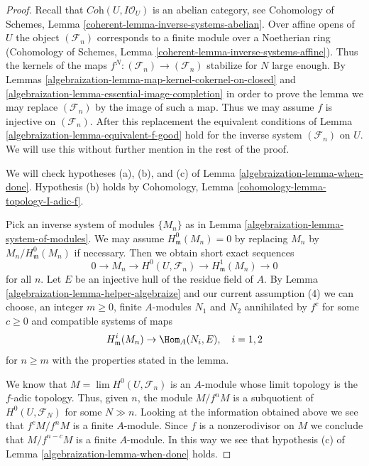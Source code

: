 \begin{proof}

Recall that $\textit{Coh}(U, I\mathcal{O}_U)$ is an abelian category, see
Cohomology of Schemes, Lemma \ref{coherent-lemma-inverse-systems-abelian}.
Over affine opens of $U$ the object $(\mathcal{F}_n)$
corresponds to a finite module over a Noetherian ring
(Cohomology of Schemes, Lemma \ref{coherent-lemma-inverse-systems-affine}).
Thus the kernels of the maps $f^N : (\mathcal{F}_n) \to (\mathcal{F}_n)$
stabilize for $N$ large enough. By
Lemmas \ref{algebraization-lemma-map-kernel-cokernel-on-closed} and
\ref{algebraization-lemma-essential-image-completion}
in order to prove the lemma
we may replace $(\mathcal{F}_n)$ by the image of such a map.
Thus we may assume $f$ is injective on $(\mathcal{F}_n)$.
After this replacement the equivalent conditions of
Lemma \ref{algebraization-lemma-equivalent-f-good} hold for the inverse system
$(\mathcal{F}_n)$ on $U$. We will use this without further mention
in the rest of the proof.

\medskip\noindent
We will check hypotheses (a), (b), and (c) of
Lemma \ref{algebraization-lemma-when-done}. Hypothesis (b) holds by
Cohomology, Lemma \ref{cohomology-lemma-topology-I-adic-f}.

\medskip\noindent
Pick an inverse system of modules $\{M_n\}$ as in
Lemma \ref{algebraization-lemma-system-of-modules}.
We may assume $H^0_\mathfrak m(M_n) = 0$ by replacing $M_n$ by
$M_n/H^0_\mathfrak m(M_n)$ if necessary. Then we obtain short exact
sequences
$$
0 \to M_n \to H^0(U, \mathcal{F}_n) \to H^1_\mathfrak m(M_n) \to 0
$$
for all $n$. Let $E$ be an injective hull of the residue field of $A$.
By Lemma \ref{algebraization-lemma-helper-algebraize} and our current assumption (4)
we can choose, an integer $m \geq 0$, finite $A$-modules
$N_1$ and $N_2$ annihilated by $f^c$ for some $c \geq 0$ and
compatible systems of maps
$$
H^i_\mathfrak m(M_n) \to \Hom_A(N_i, E), \quad i = 1, 2
$$
for $n \geq m$
with the properties stated in the lemma.

\medskip\noindent
We know that $M = \lim H^0(U, \mathcal{F}_n)$ is an $A$-module whose
limit topology is the $f$-adic topology. Thus, given $n$, the module
$M/f^nM$ is a subquotient of $H^0(U, \mathcal{F}_N)$ for some $N \gg n$.
Looking at the information obtained above we see that
$f^cM/f^nM$ is a finite $A$-module. Since $f$ is a nonzerodivisor
on $M$ we conclude that $M/f^{n - c}M$ is a finite $A$-module.
In this way we see that hypothesis (c) of Lemma \ref{algebraization-lemma-when-done} holds.


\end{proof}

